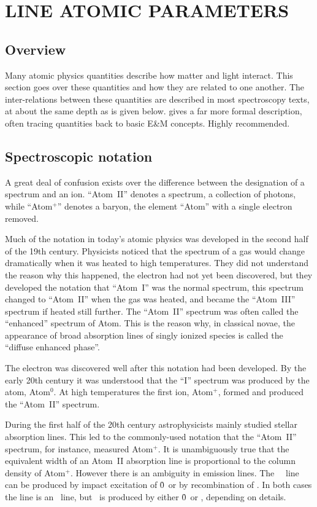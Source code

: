 \chapter{LINE ATOMIC PARAMETERS}

\section{Overview}

Many atomic physics quantities describe how matter and light interact.
This section goes over these quantities and how they are related to one
another.
The inter-relations between these quantities are described in most
spectroscopy texts, at about the same depth as is given below.  \citet{Hilborn1982} gives a far more formal description,
often tracing quantities back
to basic E\&M concepts.  Highly recommended.

\section{Spectroscopic notation}

A great deal of confusion exists over the difference between the
designation of a spectrum and an ion.  ``Atom~II'' denotes a spectrum, a
collection of photons, while ``Atom$^+$'' denotes a baryon,
the element ``Atom'' with a single electron removed.

Much of the notation in today's atomic physics was developed in the second
half of the 19th century.
Physicists noticed that the spectrum of a gas
would change dramatically when it was heated to high temperatures.
They
did not understand the reason why this happened,
the electron had not yet been discovered,
but they developed the
notation that ``Atom~I'' was the normal spectrum,
this spectrum changed
to ``Atom~II'' when the gas was heated,
and became the ``Atom~III'' spectrum if heated still further.
The ``Atom~II'' spectrum was often called the
``enhanced'' spectrum of Atom.
This is the reason why, in classical novae,
the appearance of broad absorption lines of singly ionized species
is called
the ``diffuse enhanced phase''.

The electron was discovered well after this notation had been developed.
By the early 20th century it was understood that the ``I'' spectrum was
produced by the atom, Atom$^0$.
At high temperatures the first ion, Atom$^+$,
formed and produced the ``Atom~II'' spectrum.

During the first half of the 20th century astrophysicists mainly studied
stellar absorption lines.
This led to the commonly-used notation that the
``Atom~II'' spectrum, for instance, measured Atom$^+$.
It is unambiguously true
that the equivalent width of an Atom~II absorption line is proportional
to the column density of Atom$^+$.
However there is an ambiguity in emission
lines.
The \la\ \hi\ line can be produced by impact excitation
of \h0\ or by recombination of \hplus.
In both cases the line is an \hi\ line, but \hi\ is
produced by either \h0\ or \hplus, depending on details.

